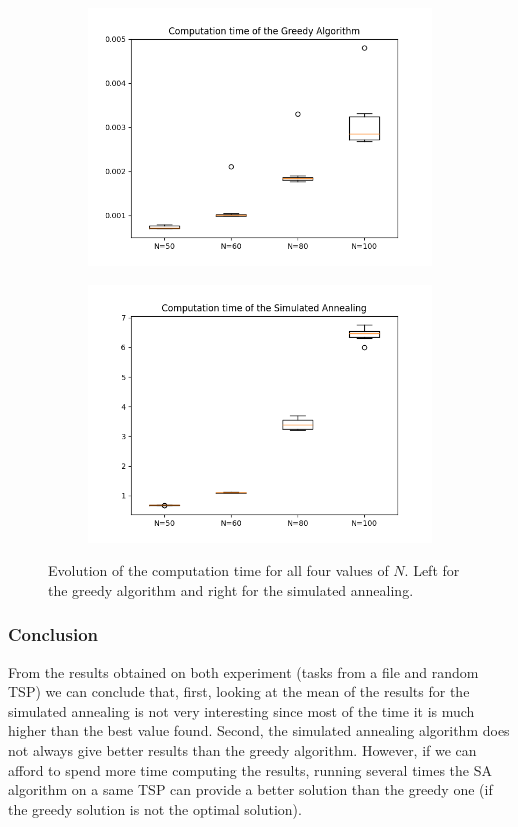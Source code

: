 \documentclass[14pt]
{article}
\begin{document}
\begin{figure}[H]
\centering
\begin{subfigure}{0.49\textwidth}
\centering
\includegraphics[width = \textwidth]{img/timeG.png}
\end{subfigure}
\begin{subfigure}{0.49\textwidth}
\centering
\includegraphics[width = \textwidth]{img/timeSA.png}
\end{subfigure}
\caption{\label{T4N} Evolution of the computation time for all four values of $N$. Left for the greedy algorithm and right for the simulated annealing.}
\end{figure}

\subsubsection{Conclusion}
From the results obtained on both experiment (tasks from a file and random TSP) we can conclude that, first, looking at the mean of the results for the simulated annealing is not very interesting since most of the time it is much higher than the best value found. Second, the simulated annealing algorithm does not always give better results than the greedy algorithm. However, if we can afford to spend more time computing the results, running several times the SA algorithm on a same TSP can provide a better solution than the greedy one (if the greedy solution is not the optimal solution).
\end{document}

